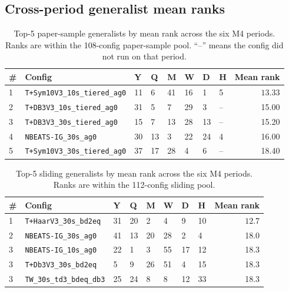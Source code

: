 \documentclass{article}
\begin{document}
\subsection{Cross-period generalist mean ranks}
\label{app:m4_tables:generalists}

\begin{table}[h]
\centering
\scriptsize
\setlength{\tabcolsep}{3pt}
\caption{Top-5 paper-sample generalists by mean rank across the six M4 periods. Ranks are within the 108-config paper-sample pool. ``--'' means the config did not run on that period.}
\label{tab:generalist_paper}
\begin{tabular}{@{}llllllllr@{}}
\toprule
\# & Config & Y & Q & M & W & D & H & Mean rank \\
\midrule
1 & \texttt{T+Sym10V3\_10s\_tiered\_ag0} & 11 & 6  & 41 & 16 & 1  & 5 & $\mathbf{13.33}$ \\
2 & \texttt{T+DB3V3\_10s\_tiered\_ag0}   & 31 & 5  & 7  & 29 & 3  & -- & 15.00 \\
3 & \texttt{T+DB3V3\_30s\_tiered\_ag0}   & 15 & 7  & 13 & 28 & 13 & -- & 15.20 \\
4 & \texttt{NBEATS-IG\_30s\_ag0}         & 30 & 13 & 3  & 22 & 24 & 4 & 16.00 \\
5 & \texttt{T+Sym10V3\_30s\_tiered\_ag0} & 37 & 17 & 28 & 4  & 6  & -- & 18.40 \\
\bottomrule
\end{tabular}
\end{table}

\begin{table}[h]
\centering
\scriptsize
\setlength{\tabcolsep}{3pt}
\caption{Top-5 sliding generalists by mean rank across the six M4 periods. Ranks are within the 112-config sliding pool.}
\label{tab:generalist_sliding}
\begin{tabular}{@{}llllllllr@{}}
\toprule
\# & Config & Y & Q & M & W & D & H & Mean rank \\
\midrule
1 & \texttt{T+HaarV3\_30s\_bd2eq}         & 31 & 20 & 2  & 4  & 9  & 10 & $\mathbf{12.7}$ \\
2 & \texttt{NBEATS-IG\_30s\_ag0}          & 41 & 13 & 20 & 28 & 2  & 4  & 18.0 \\
3 & \texttt{NBEATS-IG\_10s\_ag0}          & 22 & 1  & 3  & 55 & 17 & 12 & 18.3 \\
3 & \texttt{T+Db3V3\_30s\_bd2eq}          & 5  & 9  & 26 & 51 & 4  & 15 & 18.3 \\
3 & \texttt{TW\_30s\_td3\_bdeq\_db3}      & 25 & 24 & 8  & 8  & 12 & 33 & 18.3 \\
\bottomrule
\end{tabular}
\end{table}
\end{document}

